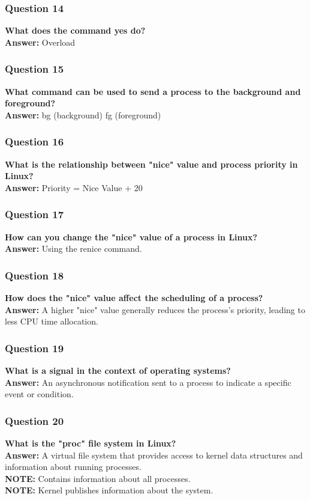 \documentclass{article}
\begin{document}
\subsubsection*{Question 14}
\textbf{What does the command yes do?} \\
\textbf{Answer:} Overload

\subsubsection*{Question 15}
\textbf{What command can be used to send a process to the background and foreground?} \\
\textbf{Answer:} bg (background) fg (foreground)

\subsubsection*{Question 16}
\textbf{What is the relationship between "nice" value and process priority in Linux?} \\
\textbf{Answer:} Priority = Nice Value + 20

\subsubsection*{Question 17}
\textbf{How can you change the "nice" value of a process in Linux?} \\
\textbf{Answer:} Using the renice command.

\subsubsection*{Question 18}
\textbf{How does the "nice" value affect the scheduling of a process?} \\
\textbf{Answer:} A higher "nice" value generally reduces the process's priority, leading to less CPU time allocation.

\subsubsection*{Question 19}
\textbf{What is a signal in the context of operating systems?} \\
\textbf{Answer:} An asynchronous notification sent to a process to indicate a specific event or condition.

\subsubsection*{Question 20}
\textbf{What is the "proc" file system in Linux?} \\
\textbf{Answer:} A virtual file system that provides access to kernel data structures and information about running processes. \\
\textbf{NOTE:} Contains information about all processes. \\
\textbf{NOTE:} Kernel publishes information about the system.
\end{document}
